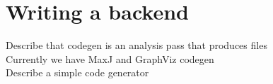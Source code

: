 \section{Writing a backend}

Describe that codegen is an analysis pass that produces files \\
Currently we have MaxJ and GraphViz codegen \\
Describe a simple code generator
